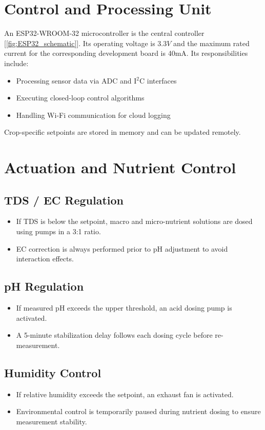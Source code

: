 \section{Control and Processing Unit}
An ESP32-WROOM-32 microcontroller is the central controller [\ref{fig:ESP32_schematic}]. Its operating voltage is $3.3V$ and the maximum rated current for the corresponding development board is 40mA. Its responsibilities include:
\begin{itemize}
    \item Processing sensor data via ADC and I$^2$C interfaces
    \item Executing closed-loop control algorithms
    \item Handling Wi-Fi communication for cloud logging
\end{itemize}
Crop-specific setpoints are stored in memory and can be updated remotely.

\section{Actuation and Nutrient Control}
\subsection{TDS / EC Regulation}
\begin{itemize}
    \item If TDS is below the setpoint, macro and micro-nutrient solutions are dosed using pumps in a 3:1 ratio.
    \item EC correction is always performed prior to pH adjustment to avoid interaction effects.
\end{itemize}

\subsection{pH Regulation}
\begin{itemize}
    \item If measured pH exceeds the upper threshold, an acid dosing pump is activated.
    \item A 5-minute stabilization delay follows each dosing cycle before re-measurement.
\end{itemize}

\subsection{Humidity Control}
\begin{itemize}
    \item If relative humidity exceeds the setpoint, an exhaust fan is activated.
    \item Environmental control is temporarily paused during nutrient dosing to ensure measurement stability.
\end{itemize}

